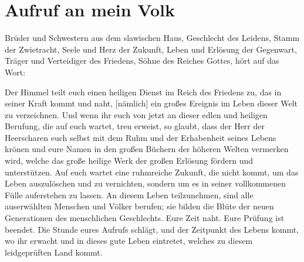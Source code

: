 \chapter{Aufruf an mein Volk}



\begin{center}
    \normalfont\scshape\large{}
\end{center}



\begin{center}
    \normalfont\scshape{}
	
\end{center}

\vspace{1em}

\begin{center}
    \normalfont\scshape\large{}
\end{center}


\begin{center}
    \normalfont\scshape{}
\end{center}



Brüder und Schwestern aus dem slawischen Haus, Geschlecht des Leidens, Stamm der Zwietracht, Seele und Herz der Zukunft, Leben und Erlösung der Gegenwart, Träger und Verteidiger des Friedens, Söhne des Reiches Gottes, hört auf das Wort:

Der Himmel teilt euch einen heiligen Dienst im Reich des Friedens zu, das in seiner Kraft kommt und naht, [nämlich] ein großes Ereignis im Leben dieser Welt zu verzeichnen. Und wenn ihr euch von jetzt an dieser edlen und heiligen Berufung, die auf euch wartet, treu erweist, so glaubt, dass der Herr der Heerscharen euch selbst mit dem Ruhm und der Erhabenheit seines Lebens krönen und eure Namen in den großen Büchern der höheren Welten vermerken wird, welche das große heilige Werk der großen Erlösung fördern und unterstützen. Auf euch wartet eine ruhmreiche Zukunft, die nicht kommt, um das Leben auszulöschen und zu vernichten, sondern um es in seiner vollkommenen Fülle auferstehen zu lassen. An diesem Leben teilzunehmen, sind alle auserwählten Menschen und Völker berufen; sie bilden die Blüte der neuen Generationen des menschlichen Geschlechts. Eure Zeit naht. Eure Prüfung ist beendet. Die Stunde eures Aufrufs schlägt, und der Zeitpunkt des Lebens kommt, wo ihr erwacht und in dieses gute Leben eintretet, welches zu diesem leidgeprüften Land kommt. 

